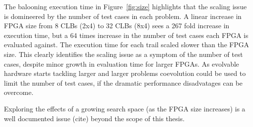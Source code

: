 The balooning execution time in Figure~\ref{fig:size} highlights that the
scaling issue is domineered by the number of test cases in each problem. A linear increase in FPGA
size from 8 CLBs (2x4) to 32 CLBs (8x4) sees a 267 fold increase in execution
time, but a 64 times increase in the number of test cases each FPGA is evaluated
against. The execution time for each trail scaled slower than the FPGA size.
This clearly identifies the scaling issue as a symptom of the number
of test cases, despite minor growth in evaluation time for larger FPGAs.
As evolvable hardware starts tackling larger and larger
problems coevolution could be used to limit the number of test cases, if the
dramatic performance disadvatages can be overcome.


Exploring the effects of a growing search space (as the FPGA size increases)
is a well documented issue (\todo cite) beyond the scope of this thesis.
